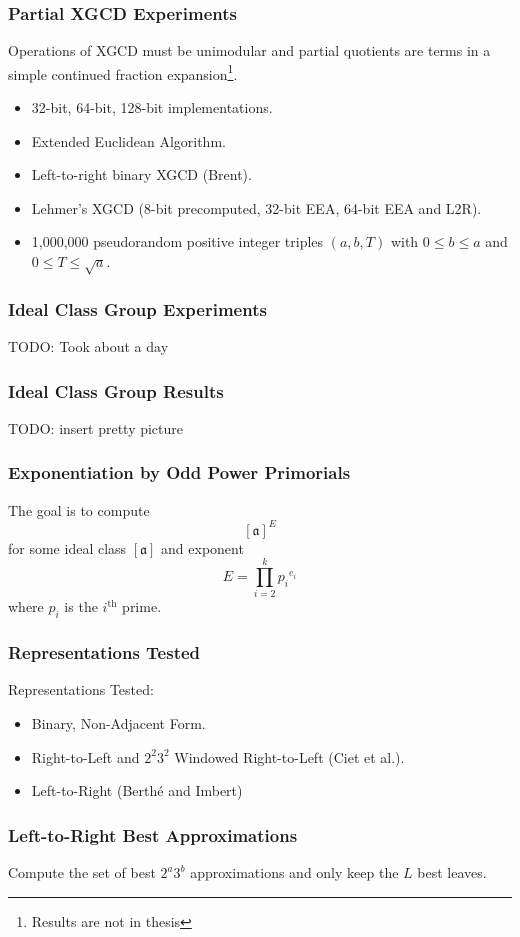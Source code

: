 \documentclass{beamer}
\newcommand{\ideal}{\mathfrak}
\newcommand{\idealclass}[1]{\left[ \ideal #1 \right]}
\newcommand{\aclass}{\idealclass a}
\newcommand{\ith}{i^{\textrm{th}}}
\begin{document}
\begin{frame}
\frametitle{Partial XGCD Experiments}
Operations of XGCD must be unimodular and partial quotients are terms in a simple continued fraction expansion\footnote{Results are not in thesis}.
\begin{itemize}
\item 32-bit, 64-bit, 128-bit implementations.
\item Extended Euclidean Algorithm.
\item Left-to-right binary XGCD (Brent).
\item Lehmer's XGCD (8-bit precomputed, 32-bit EEA, 64-bit EEA and L2R).
\item 1,000,000 pseudorandom positive integer triples $(a, b, T)$ with $0 \le b \le a$ and $0 \le T \le \sqrt a$.
\end{itemize}
\end{frame}

\begin{frame}
\frametitle{Ideal Class Group Experiments}
TODO: Took about a day
\end{frame}

\begin{frame}
\frametitle{Ideal Class Group Results}
TODO: insert pretty picture
\end{frame}

\begin{frame}
\frametitle{Exponentiation by Odd Power Primorials}
The goal is to compute
\[
\aclass ^ E
\]
for some ideal class $\aclass$ and exponent
\[
	E = \prod_{i=2}^k {p_i}^{e_i}
\]
where $p_i$ is the $\ith$ prime.
\end{frame}

\begin{frame}
\frametitle{Representations Tested}
Representations Tested:
\begin{itemize}
\item Binary, Non-Adjacent Form.
\item Right-to-Left and $2^2 3^2$ Windowed Right-to-Left (Ciet et al.).
\item Left-to-Right (Berth{\'e} and Imbert)
\end{itemize}
\end{frame}

\begin{frame}
\frametitle{Left-to-Right Best Approximations}
Compute the set of best $2^a3^b$ approximations and only keep the $L$ best leaves.
\end{frame}
\end{document}
